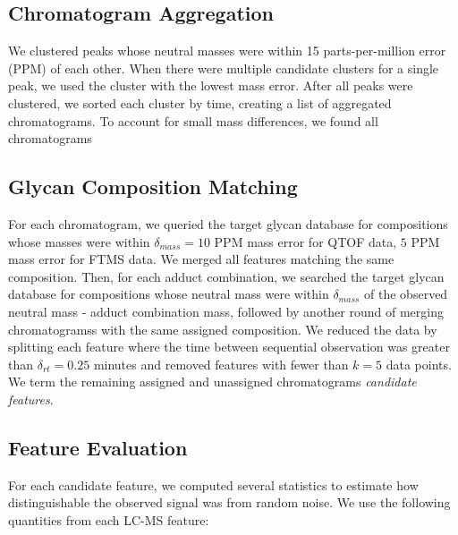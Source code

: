 \subsection{Chromatogram Aggregation}
    We clustered peaks whose neutral masses were within 15 parts-per-million error
    (PPM) of each other. When there were multiple candidate clusters for a single peak,
    we used the cluster with the lowest mass error. After all peaks were clustered,
    we sorted each cluster by time, creating a list of aggregated chromatograms. To account
    for small mass differences, we found all chromatograms 

\subsection{Glycan Composition Matching}
    For each chromatogram, we queried the target glycan database for compositions whose
    masses were within $\delta_{mass} = 10$ PPM mass error for QTOF data, $5$ PPM mass error
    for FTMS data. We merged all features matching the same composition. Then, for
    each adduct combination, we searched the target glycan database for compositions
    whose neutral mass were within $\delta_{mass}$ of the observed neutral mass - adduct
    combination mass, followed by another round of merging chromatogramss with the same
    assigned composition. We reduced the data by splitting each feature where the time
    between sequential observation was greater than $\delta_{rt} = 0.25$ minutes and
    removed features with fewer than $k = 5$ data points. We term the remaining assigned
    and unassigned chromatograms {\em candidate features}.

\subsection{Feature Evaluation}
    For each candidate feature, we computed several statistics to estimate how distinguishable
    the observed signal was from random noise. We use the following quantities from each LC-MS
    feature:

